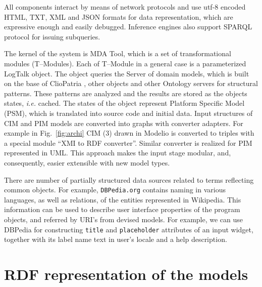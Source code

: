 \documentclass[12pt,a4paper]{llncs}
\begin{document}
All components interact by means of network protocols and use utf-8 encoded HTML, TXT, XML and JSON formats for data representation, which are expressive enough and easily debugged.  Inference engines also support SPARQL protocol for issuing subqueries.

The kernel of the system is MDA Tool, which is a set of transformational modules (T--Modules). Each of T--Module in a general case is a parameterized LogTalk object.  The object queries the Server of domain models, which is built on the base of ClioPatria \cite{Clio}, other objects and other Ontology servers for structural patterns.  These patterns are analyzed and the results are stored as the objects states, \emph{i.e.} cached.  The states of the object represent Platform Specific Model (PSM), which is translated into source code and initial data.  Input structures of CIM and PIM models are converted into graphs with converter adapters.  For example in Fig.~\ref{fig:archi} CIM (3) drawn in Modelio \cite{modelio} is converted to triples with a special module ``XMI to RDF converter''.  Similar converter is realized for PIM represented in UML.  This approach makes the input stage modular, and, consequently, easier extensible with new model types.


There are number of partially structured data sources related to terms reflecting common objects.  For example, \texttt{DBPedia.org} contains naming in various languages, as well as relations, of the entities represented in Wikipedia.  This information can be used to describe user interface properties of the program objects, and referred by URI's from devised models.  For example, we can use DBPedia for constructing \texttt{title} and \texttt{placeholder} attributes of an input widget, together with its label name text in user's locale and a help description.


\section{RDF representation of the models}
\label{sec:rdf-repr}
\end{document}
